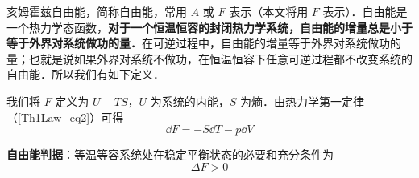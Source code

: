 

亥姆霍兹自由能，简称自由能，常用 $A$ 或 $F$ 表示（本文将用 $F$ 表示）．自由能是一个热力学态函数，\textbf{对于一个恒温恒容的封闭热力学系统，自由能的增量总是小于等于外界对系统做功的量．}在可逆过程中，自由能的增量等于外界对系统做功的量；也就是说如果外界对系统不做功，在恒温恒容下任意可逆过程都不改变系统的自由能．所以我们有如下定义．

我们将 $F$ 定义为 $U-TS$，$U$ 为系统的内能，$S$ 为熵．由热力学第一定律（\autoref{Th1Law_eq2}）可得
\begin{equation}
\dd F=-S\dd T-p\dd V
\end{equation}

\textbf{自由能判据}：等温等容系统处在稳定平衡状态的必要和充分条件为
\begin{equation}
\Delta F>0
\end{equation}